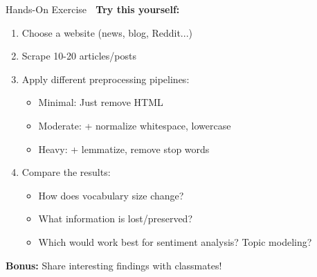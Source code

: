 \documentclass[aspectratio=169]{beamer}
\begin{document}
\begin{frame}[shrink=10]{Hands-On Exercise 🧪}
    \textbf{Try this yourself:}

    \begin{enumerate}\setlength{\itemsep}{0pt}
        \item Choose a website (news, blog, Reddit...)
        \item Scrape 10-20 articles/posts
        \item Apply different preprocessing pipelines:
        \begin{itemize}\setlength{\itemsep}{0pt}
            \item Minimal: Just remove HTML
            \item Moderate: + normalize whitespace, lowercase
            \item Heavy: + lemmatize, remove stop words
        \end{itemize}
        \item Compare the results:
        \begin{itemize}\setlength{\itemsep}{0pt}
            \item How does vocabulary size change?
            \item What information is lost/preserved?
            \item Which would work best for sentiment analysis? Topic modeling?
        \end{itemize}
    \end{enumerate}

    \vspace{0.5em}
    \textbf{Bonus:} Share interesting findings with classmates! 🎉
\end{frame}
\end{document}
